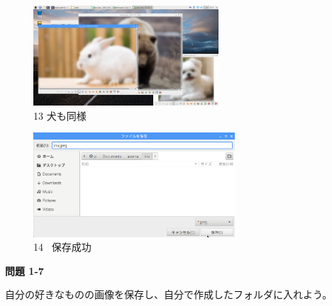 \documentclass[a4paper,12pt]{jarticle}
\begin{document}
\begin{figure}[t]
\begin{minipage}{\textwidth}
\begin{minipage}{7.22cm}
\includegraphics[width=6.911cm,height=3.729cm]{textbook-img105.png}\\
13 犬も同様
\end{minipage}
\begin{minipage}{2.582cm}
\end{minipage}
\begin{minipage}{7.665cm}
\includegraphics[width=7.527cm,height=3.905cm]{textbook-img104.png}\\
14 \ 保存成功
\end{minipage}
\end{minipage}


\centering
\end{figure}

\bigskip

{\bfseries
問題 1-7}

自分の好きなものの画像を保存し、自分で作成したフォルダに入れよう。

\clearpage
\end{document}
